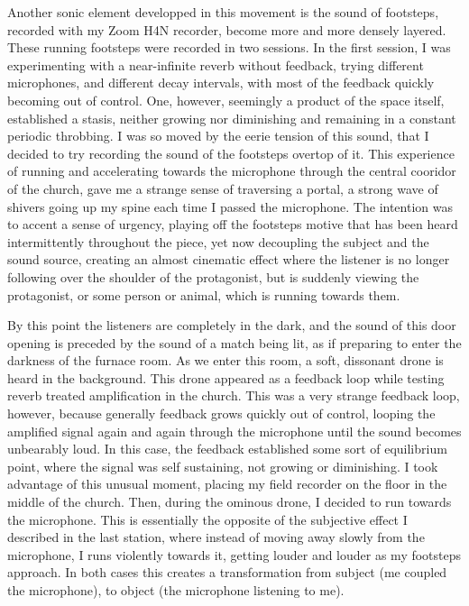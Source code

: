 \documentclass[12pt,twoside,maitrise]{dms_ks}
\theoremstyle{definition}
\begin{document}
{Another sonic element developped in this movement is the sound of footsteps, recorded with my Zoom H4N recorder, become more and more densely layered. 
These running footsteps were recorded in two sessions. 
In the first session, I was experimenting with a near-infinite reverb without feedback, trying different microphones, and different decay intervals, with most of the feedback quickly becoming out of control. 
One, however, seemingly a product of the space itself, established a stasis, neither growing nor diminishing and remaining in a constant periodic throbbing. 
I was so moved by the eerie tension of this sound, that I decided to try recording the sound of the footsteps overtop of it. 
This experience of running and accelerating towards the microphone through the central cooridor of the church, gave me a strange sense of traversing a portal, a strong wave of shivers going up my spine each time I passed the microphone.
The intention was to accent a sense of urgency, playing off the footsteps motive that has been heard intermittently throughout the piece, yet now decoupling the subject and the sound source, creating an almost cinematic effect where the listener is no longer following over the shoulder of the protagonist, but is suddenly viewing the protagonist, or some person or animal, which is running towards them. 

By this point the listeners are completely in the dark, and the sound of this door opening is preceded by the sound of a match being lit, as if preparing to enter the darkness of the furnace room. 
As we enter this room, a soft, dissonant drone is heard in the background. 
This drone appeared as a feedback loop while testing reverb treated amplification in the church. 
This was a very strange feedback loop, however, because generally feedback grows quickly out of control, looping the amplified signal again and again through the microphone until the sound becomes unbearably loud. 
In this case, the feedback established some sort of equilibrium point, where the signal was self sustaining, not growing or diminishing. 
I took advantage of this unusual moment, placing my field recorder on the floor in the middle of the church. 
Then, during the ominous drone, I decided to run towards the microphone. 
This is essentially the opposite of the subjective effect I described in the last station, where instead of moving away slowly from the microphone, I runs violently towards it, getting louder and louder as my footsteps approach. 
In both cases this creates a transformation from subject (me coupled the microphone), to object (the microphone listening to me).

}
\end{document}
